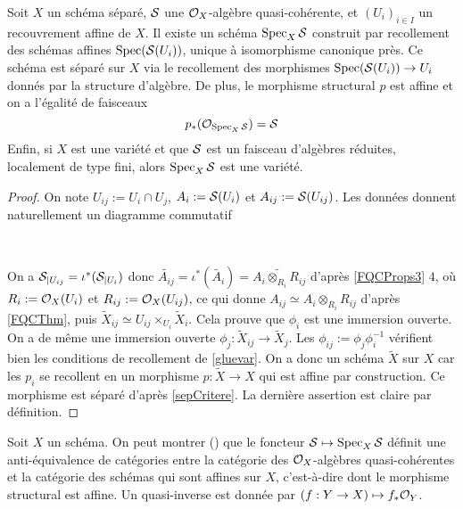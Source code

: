 \begin{cons}	\label{relspec}
Soit $X$ un schéma séparé, $\mathcal{S}$ une $\mathcal{O}_X$-algèbre quasi-cohérente, et $(U_i)_{i\in I}$ un recouvrement affine de $X$. Il existe un schéma $\operatorname{Spec}_X \mathcal{S}$ construit par recollement des schémas affines $\operatorname{Spec}(\mathcal{S}(U_i))$, unique à isomorphisme canonique près. Ce schéma est séparé sur $X$ via le recollement des morphismes $\operatorname{Spec}(\mathcal{S}(U_i))\rightarrow U_i$ donnés par la structure d'algèbre. De plus, le morphisme structural $p$ est affine et on a l'égalité de faisceaux
$$p_*(\mathcal{O}_{\operatorname{Spec}_X\mathcal{S}})=\mathcal{S}$$
Enfin, si $X$ est une variété et que $\mathcal{S}$ est un faisceau d'algèbres réduites, localement de type fini, alors $\operatorname{Spec}_X \mathcal{S}$ est une variété.
\end{cons}
\begin{proof}
On note $U_{ij}:=U_i\cap U_j$, $A_i:=\mathcal{S}(U_i)$ et $A_{ij}:=\mathcal{S}(U_{ij})$. Les données donnent naturellement un diagramme commutatif

	\begin{center}
	\\
	\end{center}
	
On a $\mathcal{S}_{|U_{ij}}=\iota^*(\mathcal{S}_{|U_i})$ donc $\widetilde{A_{ij}}=\iota^*(\widetilde{A_i})=\widetilde{A_i \otimes_{R_i}R_{ij}}$ d'après \ref{FQCProps3} $4$, où $R_i:=\mathcal{O}_X(U_i)$ et $R_{ij}:=\mathcal{O}_X(U_{ij})$, ce qui donne $A_{ij}\simeq A_i\otimes_{R_i}R_{ij}$ d'après \ref{FQCThm}, puis $\widetilde{X}_{ij}\simeq U_{ij}\times_{U_i}\widetilde{X}_i$. Cela prouve que $\phi_i$ est une immersion ouverte. On a de même une immersion ouverte $\phi_j:\widetilde{X}_{ij}\rightarrow \widetilde{X}_j$. Les $\phi_{ij}:=\phi_j\phi_i^{-1}$ vérifient bien les conditions de recollement de \ref{gluevar}. On a donc un schéma $\widetilde{X}$ sur $X$ car les $p_i$ se recollent en un morphisme $p:\widetilde{X}\rightarrow X$ qui est affine par construction. Ce morphisme est séparé d'après \ref{sepCritere}. La dernière assertion est claire par définition.
\end{proof}

\begin{rem}
Soit $X$ un schéma. On peut montrer (\cite[12.1]{Gortz}) que le foncteur $\mathcal{S}\mapsto \operatorname{Spec}_X\mathcal{S}$ définit une anti-équivalence de catégories entre la catégorie des $\mathcal{O}_X$-algèbres quasi-cohérentes et la catégorie des schémas qui sont affines sur $X$, c'est-à-dire dont le morphisme structural est affine. Un quasi-inverse est donnée par $(f:Y\rightarrow X)\mapsto f_*\mathcal{O}_Y$.
\end{rem}


